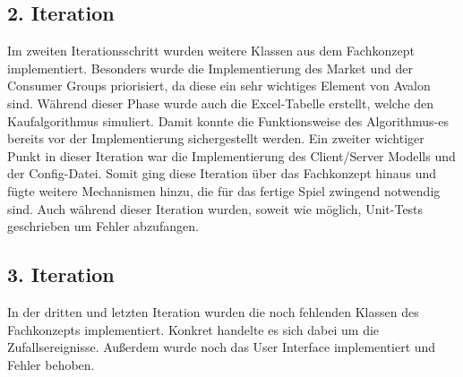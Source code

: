 \subsection{2. Iteration}
Im zweiten Iterationsschritt wurden weitere Klassen aus dem Fachkonzept implementiert. Besonders wurde die Implementierung des Market und der Consumer Groups priorisiert, da diese ein sehr wichtiges Element von Avalon sind. Während dieser Phase wurde auch die Excel-Tabelle erstellt, welche den Kaufalgorithmus simuliert. Damit konnte die Funktionsweise des Algorithmus-es bereits vor der Implementierung sichergestellt werden. Ein zweiter wichtiger Punkt in dieser Iteration war die Implementierung des Client/Server Modells und der Config-Datei. Somit ging diese Iteration über das Fachkonzept hinaus und fügte weitere Mechanismen hinzu, die für das fertige Spiel zwingend notwendig sind. Auch während dieser Iteration wurden, soweit wie möglich, Unit-Tests geschrieben um Fehler abzufangen. 

\subsection{3. Iteration}
In der dritten und letzten Iteration wurden die noch fehlenden Klassen des Fachkonzepts implementiert. Konkret handelte es sich dabei um die Zufallsereignisse. Außerdem wurde noch das User Interface implementiert und Fehler behoben.

